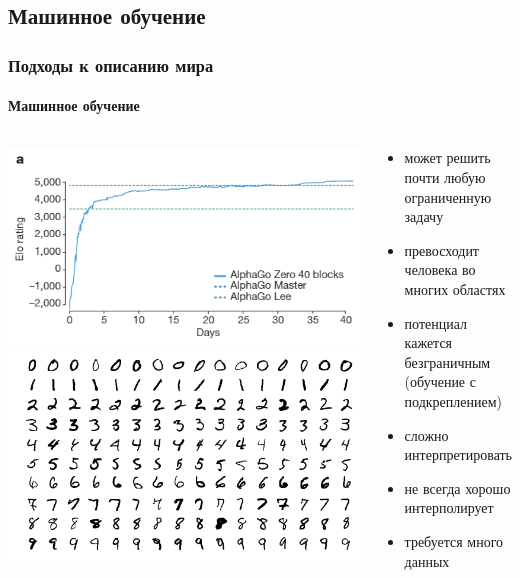 \documentclass[10pt,pdf,hyperref={unicode}]{beamer}
\begin{document}
		
		\subsection{Машинное обучение}
		
			\begin{frame}
				\frametitle{Подходы к описанию мира} 
				\framesubtitle{Машинное обучение}
					\begin{columns}
							\includegraphics[width=\linewidth]{alphago.png}
							\includegraphics[width=\linewidth]{mnist.png}
						\begin{center}
							\begin{itemize}
								\item<2-> может решить почти любую ограниченную задачу
								\item<3-> превосходит человека во многих областях
								\item<4-> потенциал кажется безграничным (обучение с подкреплением)
								\item<5-> сложно интерпретировать
								\item<6-> не всегда хорошо интерполирует  
								\item<7-> требуется много данных
							\end{itemize}
						\end{center}
					\end{columns}
			\end{frame}
			
\end{document}
